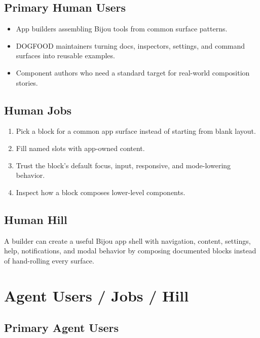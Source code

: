 \subsection{Primary Human Users}\label{record-128-primary-human-users}

\begin{itemize}
\tightlist
\item
  App builders assembling Bijou tools from common surface patterns.
\item
  DOGFOOD maintainers turning docs, inspectors, settings, and command surfaces into reusable examples.
\item
  Component authors who need a standard target for real-world composition stories.
\end{itemize}

\subsection{Human Jobs}\label{record-128-human-jobs}

\begin{enumerate}
\def\labelenumi{\arabic{enumi}.}
\tightlist
\item
  Pick a block for a common app surface instead of starting from blank layout.
\item
  Fill named slots with app-owned content.
\item
  Trust the block's default focus, input, responsive, and mode-lowering behavior.
\item
  Inspect how a block composes lower-level components.
\end{enumerate}

\subsection{Human Hill}\label{record-128-human-hill}

A builder can create a useful Bijou app shell with navigation, content, settings, help, notifications, and modal behavior by composing documented blocks instead of hand-rolling every surface.

\section{Agent Users / Jobs / Hill}\label{record-128-agent-users-jobs-hill}

\subsection{Primary Agent Users}\label{record-128-primary-agent-users}

